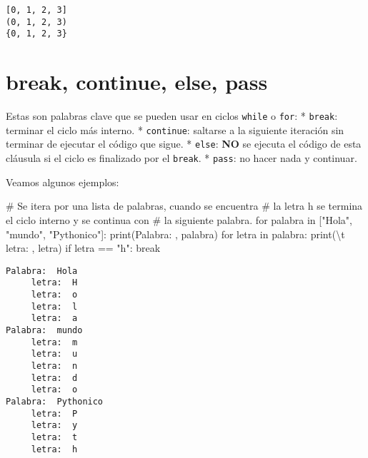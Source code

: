 \documentclass[
  letterpaper,
  DIV=11,
  numbers=noendperiod]{scrreprt}
\newenvironment{Shaded}{\begin{snugshade}}{\end{snugshade}}
\newcommand{\BuiltInTok}[1]{\textcolor[rgb]{0.00,0.23,0.31}{#1}}
\newcommand{\CharTok}[1]{\textcolor[rgb]{0.13,0.47,0.30}{#1}}
\newcommand{\CommentTok}[1]{\textcolor[rgb]{0.37,0.37,0.37}{#1}}
\newcommand{\ControlFlowTok}[1]{\textcolor[rgb]{0.00,0.23,0.31}{#1}}
\newcommand{\KeywordTok}[1]{\textcolor[rgb]{0.00,0.23,0.31}{#1}}
\newcommand{\NormalTok}[1]{\textcolor[rgb]{0.00,0.23,0.31}{#1}}
\newcommand{\OperatorTok}[1]{\textcolor[rgb]{0.37,0.37,0.37}{#1}}
\newcommand{\StringTok}[1]{\textcolor[rgb]{0.13,0.47,0.30}{#1}}
\begin{document}
\begin{verbatim}
[0, 1, 2, 3]
(0, 1, 2, 3)
{0, 1, 2, 3}
\end{verbatim}

\section{break, continue, else, pass}\label{break-continue-else-pass}

Estas son palabras clave que se pueden usar en ciclos \texttt{while} o
\texttt{for}: * \texttt{break}: terminar el ciclo más interno. *
\texttt{continue}: saltarse a la siguiente iteración sin terminar de
ejecutar el código que sigue. * \texttt{else}: \textbf{NO} se ejecuta el
código de esta cláusula si el ciclo es finalizado por el \texttt{break}.
* \texttt{pass}: no hacer nada y continuar.

Veamos algunos ejemplos:

\begin{Shaded}
\begin{Highlighting}[]
\CommentTok{\# Se itera por una lista de palabras, cuando se encuentra}
\CommentTok{\# la letra \textquotesingle{}h\textquotesingle{} se termina el ciclo interno y se continua con}
\CommentTok{\# la siguiente palabra.}
\ControlFlowTok{for}\NormalTok{ palabra }\KeywordTok{in}\NormalTok{ [}\StringTok{"Hola"}\NormalTok{, }\StringTok{"mundo"}\NormalTok{, }\StringTok{"Pythonico"}\NormalTok{]:}
    \BuiltInTok{print}\NormalTok{(}\StringTok{\textquotesingle{}Palabra: \textquotesingle{}}\NormalTok{, palabra)}
    \ControlFlowTok{for}\NormalTok{ letra }\KeywordTok{in}\NormalTok{ palabra:}
        \BuiltInTok{print}\NormalTok{(}\StringTok{\textquotesingle{}}\CharTok{\textbackslash{}t}\StringTok{ letra: \textquotesingle{}}\NormalTok{, letra)}
        \ControlFlowTok{if}\NormalTok{ letra }\OperatorTok{==} \StringTok{"h"}\NormalTok{:}
            \ControlFlowTok{break}
\end{Highlighting}
\end{Shaded}

\begin{verbatim}
Palabra:  Hola
     letra:  H
     letra:  o
     letra:  l
     letra:  a
Palabra:  mundo
     letra:  m
     letra:  u
     letra:  n
     letra:  d
     letra:  o
Palabra:  Pythonico
     letra:  P
     letra:  y
     letra:  t
     letra:  h
\end{verbatim}
\end{document}
